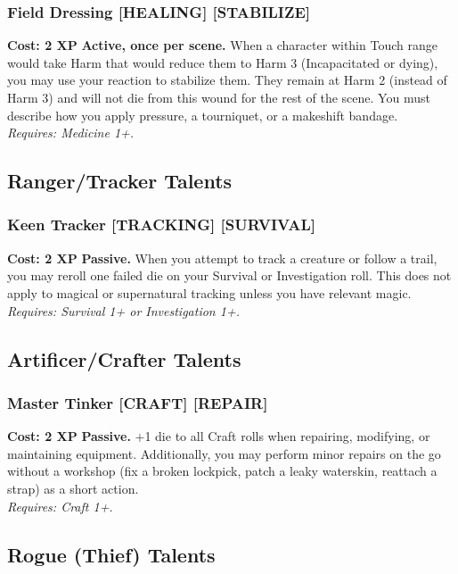 \documentclass[12pt,a4paper]{book}
\begin{document}
\subsubsection*{Field Dressing \textnormal{[HEALING] [STABILIZE]}}
\label{talent:field-dressing}
\textbf{Cost: 2 XP} \textbf{Active, once per scene.} When a character within Touch range would take Harm that would reduce them to Harm 3 (Incapacitated or dying), you may use your reaction to stabilize them. They remain at Harm 2 (instead of Harm 3) and will not die from this wound for the rest of the scene. You must describe how you apply pressure, a tourniquet, or a makeshift bandage. \\
\textit{Requires: Medicine 1+.}

\subsection*{Ranger/Tracker Talents}
\label{sec:minor-ranger}

\subsubsection*{Keen Tracker \textnormal{[TRACKING] [SURVIVAL]}}
\label{talent:keen-tracker}
\textbf{Cost: 2 XP} \textbf{Passive.} When you attempt to track a creature or follow a trail, you may reroll one failed die on your Survival or Investigation roll. This does not apply to magical or supernatural tracking unless you have relevant magic. \\
\textit{Requires: Survival 1+ or Investigation 1+.}

\subsection*{Artificer/Crafter Talents}
\label{sec:minor-artificer}

\subsubsection*{Master Tinker \textnormal{[CRAFT] [REPAIR]}}
\label{talent:master-tinker}
\textbf{Cost: 2 XP} \textbf{Passive.} +1 die to all Craft rolls when repairing, modifying, or maintaining equipment. Additionally, you may perform minor repairs on the go without a workshop (fix a broken lockpick, patch a leaky waterskin, reattach a strap) as a short action. \\
\textit{Requires: Craft 1+.}

\subsection*{Rogue (Thief) Talents}
\label{sec:minor-rogue}
\end{document}
